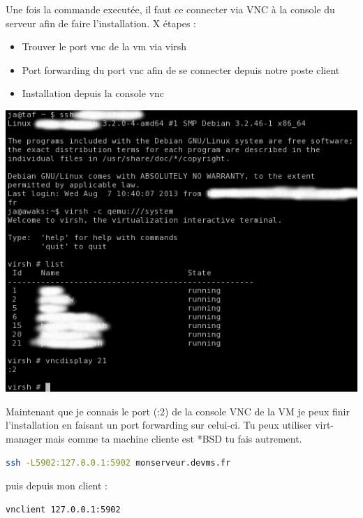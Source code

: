 \documentclass[a4paper,11pt]{article}
\begin{document}
Une fois la commande executée, il faut ce connecter via VNC à la console du
serveur afin de faire l'installation. X étapes :\\

\begin{itemize}
	\item Trouver le port vnc de la vm via virsh
	\item Port forwarding du port vnc afin de se connecter depuis notre poste client
	\item Installation depuis la console vnc
\end{itemize}

\vspace{5mm}
\includegraphics[scale=0.70]{medias/vncdisplay.png}
\vspace{5mm}

Maintenant que je connais le port (:2) de la console VNC de la VM je peux finir
l'installation en faisant un port forwarding sur celui-ci. Tu peux utiliser virt-manager mais comme ta
machine cliente est *BSD tu fais autrement.

\vspace{5mm}
\begin{lstlisting}[language=bash,caption={Création d'une VM OpenBSD avec KVM},frame=bt,breaklines=true]
ssh -L5902:127.0.0.1:5902 monserveur.devms.fr
\end{lstlisting}

\vspace{5mm}
puis depuis mon client :

\vspace{5mm}
\begin{lstlisting}[language=bash,caption={Création d'une VM OpenBSD avec KVM},frame=bt,breaklines=true]
vnclient 127.0.0.1:5902
\end{lstlisting}
\end{document}

